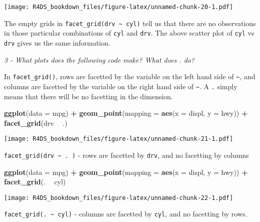 \documentclass[]{article}
\newenvironment{Shaded}{\begin{snugshade}}{\end{snugshade}}
\newcommand{\KeywordTok}[1]{\textcolor[rgb]{0.13,0.29,0.53}{\textbf{#1}}}
\newcommand{\DataTypeTok}[1]{\textcolor[rgb]{0.13,0.29,0.53}{#1}}
\newcommand{\StringTok}[1]{\textcolor[rgb]{0.31,0.60,0.02}{#1}}
\newcommand{\OperatorTok}[1]{\textcolor[rgb]{0.81,0.36,0.00}{\textbf{#1}}}
\newcommand{\NormalTok}[1]{#1}
\theoremstyle{definition}
\theoremstyle{definition}
\theoremstyle{definition}
\theoremstyle{remark}
\begin{document}
\texttt{[image: R4DS\_bookdown\_files/figure-latex/unnamed-chunk-20-1.pdf]}

The empty grids in \texttt{facet\_grid(drv\ \textasciitilde{}\ cyl)}
tell us that there are no observations in those particular combinations
of \texttt{cyl} and \texttt{drv}. The above scatter plot of \texttt{cyl}
vs \texttt{drv} gives us the same information.

\emph{3 - What plots does the following code make? What does . do?}

In \texttt{facet\_grid()}, rows are facetted by the variable on the left
hand side of \texttt{\textasciitilde{}}, and columns are facetted by the
variable on the right hand side of \texttt{\textasciitilde{}}. A
\texttt{.} simply means that there will be no facetting in the
dimension.

\begin{Shaded}
\begin{Highlighting}[]
\KeywordTok{ggplot}\NormalTok{(}\DataTypeTok{data =}\NormalTok{ mpg) }\OperatorTok{+}\StringTok{ }
\StringTok{  }\KeywordTok{geom_point}\NormalTok{(}\DataTypeTok{mapping =} \KeywordTok{aes}\NormalTok{(}\DataTypeTok{x =}\NormalTok{ displ, }\DataTypeTok{y =}\NormalTok{ hwy)) }\OperatorTok{+}
\StringTok{  }\KeywordTok{facet_grid}\NormalTok{(drv }\OperatorTok{~}\StringTok{ }\NormalTok{.)}
\end{Highlighting}
\end{Shaded}

\texttt{[image: R4DS\_bookdown\_files/figure-latex/unnamed-chunk-21-1.pdf]}

\texttt{facet\_grid(drv\ \textasciitilde{}\ .\ )} - rows are facetted by
\texttt{drv}, and no facetting by columns

\begin{Shaded}
\begin{Highlighting}[]
\KeywordTok{ggplot}\NormalTok{(}\DataTypeTok{data =}\NormalTok{ mpg) }\OperatorTok{+}\StringTok{ }
\StringTok{  }\KeywordTok{geom_point}\NormalTok{(}\DataTypeTok{mapping =} \KeywordTok{aes}\NormalTok{(}\DataTypeTok{x =}\NormalTok{ displ, }\DataTypeTok{y =}\NormalTok{ hwy)) }\OperatorTok{+}
\StringTok{  }\KeywordTok{facet_grid}\NormalTok{(. }\OperatorTok{~}\StringTok{ }\NormalTok{cyl)}
\end{Highlighting}
\end{Shaded}

\texttt{[image: R4DS\_bookdown\_files/figure-latex/unnamed-chunk-22-1.pdf]}

\texttt{facet\_grid(.\ \textasciitilde{}\ cyl)} - columns are facetted
by \texttt{cyl}, and no facetting by rows.
\end{document}
